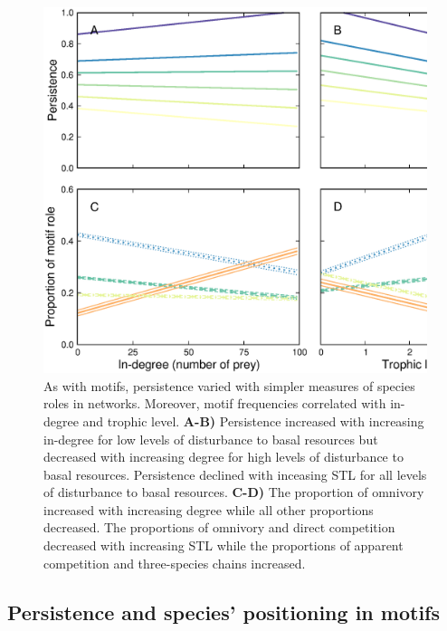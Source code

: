 \documentclass[12pt]{article}
\begin{document}
\begin{spacing}{2.0}
            \begin{figure}
                \centering
                \includegraphics[width=\textwidth]{figures/roles_vs_TL.eps}
                \caption{As with motifs, persistence varied with simpler measures of species roles in networks. Moreover, motif frequencies correlated with in-degree and trophic level. \textbf{A-B)} Persistence increased with increasing in-degree for low levels of disturbance to basal resources but decreased with increasing degree for high levels of disturbance to basal resources.
                Persistence declined with inceasing STL for all levels of disturbance to basal resources.
                \textbf{C-D)} The proportion of omnivory increased with increasing degree while all other proportions decreased. The proportions of omnivory and direct competition decreased with increasing STL while the proportions of apparent competition and three-species chains increased.}
                \label{fig:motifs_vs_TL_and_deg}
            \end{figure}        
        

    \subsection*{Persistence and species' positioning in motifs}


\end{spacing}
\end{document}
